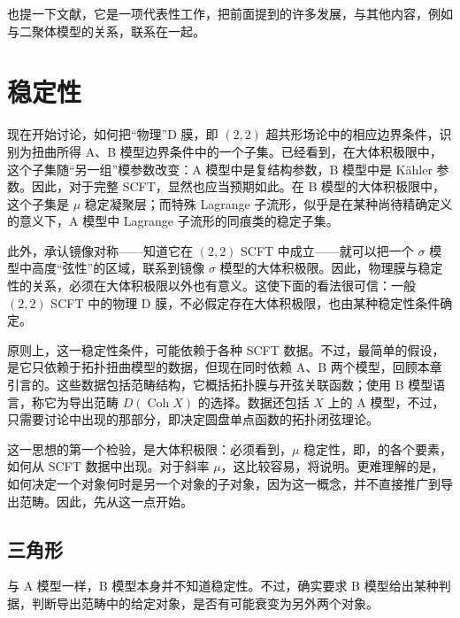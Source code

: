 也提一下文献，它是一项代表性工作，把前面提到的许多发展，与其他内容，例如与二聚体模型的关系，联系在一起。

\section{稳定性}\label{sec:5.5}

现在开始讨论，如何把“物理”D 膜，即 $(2,2)$ 超共形场论中的相应边界条件，识别为扭曲所得 A、B 模型边界条件中的一个子集。已经看到，在大体积极限中，这个子集随“另一组”模参数改变：A 模型中是复结构参数，B 模型中是 K\"ahler 参数。因此，对于完整 SCFT，显然也应当预期如此。在 B 模型的大体积极限中，这个子集是 $\mu$ 稳定凝聚层；而特殊 Lagrange 子流形，似乎是在某种尚待精确定义的意义下，A 模型中 Lagrange 子流形的同痕类的稳定子集。

此外，承认镜像对称——知道它在 $(2,2)$ SCFT 中成立——就可以把一个 $\sigma$ 模型中高度“弦性”的区域，联系到镜像 $\sigma$ 模型的大体积极限。因此，物理膜与稳定性的关系，必须在大体积极限以外也有意义。这使下面的看法很可信：一般 $(2,2)$ SCFT 中的物理 D 膜，不必假定存在大体积极限，也由某种稳定性条件确定。

原则上，这一稳定性条件，可能依赖于各种 SCFT 数据。不过，最简单的假设，是它只依赖于拓扑扭曲模型的数据，但现在同时依赖 A、B 两个模型，回顾本章引言的。这些数据包括范畴结构，它概括拓扑膜与开弦关联函数；使用 B 模型语言，称它为导出范畴 $D(\operatorname{Coh}X)$ 的选择。数据还包括 $X$ 上的 A 模型，不过，只需要讨论中出现的那部分，即决定圆盘单点函数的拓扑闭弦理论。

这一思想的第一个检验，是大体积极限：必须看到，$\mu$ 稳定性，即，的各个要素，如何从 SCFT 数据中出现。对于斜率 $\mu$，这比较容易，将说明。更难理解的是，如何决定一个对象何时是另一个对象的子对象，因为这一概念，并不直接推广到导出范畴。因此，先从这一点开始。

\subsection{三角形}\label{sec:5.5.1}

与 A 模型一样，B 模型本身并不知道稳定性。不过，确实要求 B 模型给出某种判据，判断导出范畴中的给定对象，是否有可能衰变为另外两个对象。

